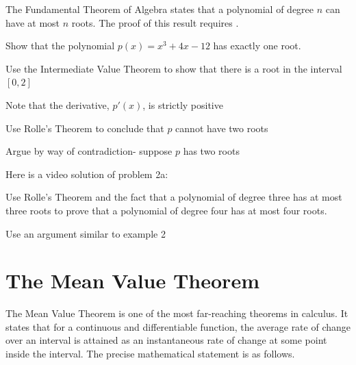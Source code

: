 \documentclass[handout]{ximera}
\begin{document}
\begin{remark} The Fundamental Theorem of Algebra states that a polynomial of degree $n$ can have at most $n$ roots.
	The proof of this result requires .
\end{remark}

\begin{problem}[problem 2a]
  Show that the polynomial $p(x) = x^3 + 4x - 12$ has exactly one root.

  \begin{hint} 
    Use the Intermediate Value Theorem to show that there is a root in the interval $[0,2]$
  \end{hint}
  \begin{hint} 
    Note that the derivative, $p'(x)$, is strictly positive
  \end{hint}
  \begin{hint} 
    Use Rolle's Theorem to conclude that $p$ cannot have two roots
  \end{hint}
  \begin{hint} 
    Argue by way of contradiction- suppose $p$ has two roots 
  \end{hint}

  \end{problem}

Here is a video solution of  problem 2a:
\begin{foldable}
\end{foldable}

\begin{problem}[problem 2b]
Use Rolle's Theorem and the fact that a polynomial of degree three has at most three 
roots to prove that a polynomial of degree four has at most four roots.
\begin{hint} 
	Use an argument similar to example 2
\end{hint}
\end{problem}

\section{The Mean Value Theorem}


The Mean Value Theorem is one of the most far-reaching theorems in calculus. It states that for a continuous 
and differentiable function, the average rate of change over an interval is attained as an 
instantaneous rate of change at some point inside the interval. The precise mathematical statement is as follows.\\
\end{document}
